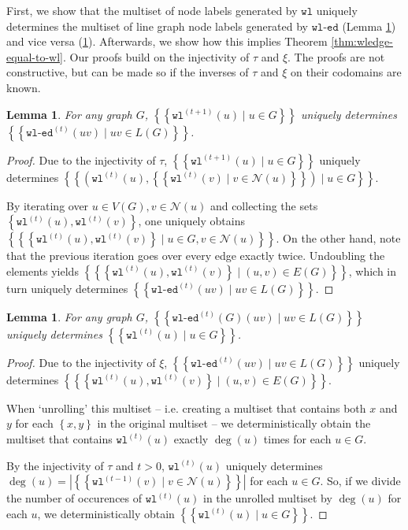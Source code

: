 \documentclass{article}
\newtheorem{lemma}[theorem]{Lemma}
\newcommand{\set}[1]{\left\{#1\right\}}
\newcommand{\multiset}[1]{\left\{\!\!\left\{#1\right\}\!\!\right\}}
\newcommand{\iter}[1]{^{(#1)}}
\newcommand{\wl}{\texttt{wl}}
\newcommand{\wledge}{\texttt{wl-ed}}
\newcommand{\dec}{\xi}
\newcommand{\hash}{\tau}
\newcommand{\nbh}{\mathcal{N}}
\begin{document}

First, we show that the multiset of node labels generated by $\wl$ uniquely determines the multiset of line graph node labels generated by $\wledge$ (Lemma \ref{lemma:wl-determines-wledge}) and vice versa (\ref{lemma:wledge-determines-wl}). Afterwards, we show how this implies Theorem \ref{thm:wledge-equal-to-wl}. Our proofs build on the injectivity of $\hash$ and $\dec$. The proofs are not constructive, but can be made so if the inverses of $\hash$ and $\dec$ on their codomains are known.

\begin{lemma}   \label{lemma:wl-determines-wledge}
    For any graph $G$, $\multiset{\wl\iter{t+1}(u) \mid u\in G}$ uniquely determines $\multiset{\wledge\iter{t}(uv) \mid uv\in L(G)}$.
\end{lemma}
\begin{proof}
    Due to the injectivity of $\hash$,
    $\multiset{\wl\iter{t+1}(u) \mid u\in G}$
    uniquely determines
    $\multiset{\left(
        \wl\iter{t}(u),
        \multiset{\wl\iter{t}(v) \mid v\in \nbh(u)}
    \right) \mid u\in G}$.

    By iterating over $u\in V(G), v\in\nbh(u)$ and collecting the sets $\set{\wl\iter{t}(u), \wl\iter{t}(v)}$, one uniquely obtains $\multiset{\set{\wl\iter{t}(u), \wl\iter{t}(v)} \mid u\in G, v\in\nbh(u)}$.
    On the other hand, note that the previous iteration goes over every edge exactly twice. Undoubling the elements yields $\multiset{\set{\wl\iter{t}(u), \wl\iter{t}(v)} \mid (u,v)\in E(G)}$, which in turn uniquely determines $\multiset{\wledge\iter{t}(uv) \mid uv\in L(G)}$.

\end{proof}

\begin{lemma}   \label{lemma:wledge-determines-wl}
    For any graph $G$, $\multiset{\wledge\iter{t}(G)(uv) \mid uv\in L(G)}$ uniquely determines $\multiset{\wl\iter{t}(u) \mid u\in G}$.
\end{lemma}
\begin{proof}
    Due to the injectivity of $\dec$,
    $\multiset{\wledge\iter{t}(uv) \mid uv\in L(G)}$
    uniquely determines
    $\multiset{\set{\wl\iter{t}(u), \wl\iter{t}(v)} \mid (u,v)\in E(G)}$.

    When `unrolling' this multiset -- i.e. creating a multiset that contains both $x$ and $y$ for each $\set{x,y}$ in the original multiset -- we deterministically obtain the multiset that contains $\wl\iter{t}(u)$ exactly $\deg(u)$ times for each $u\in G$.

    By the injectivity of $\hash$ and $t>0$, $\wl\iter{t}(u)$ uniquely determines $\deg(u) = \left\lvert\multiset{\wl\iter{t-1}(v) \mid v\in \nbh(u)}\right\rvert$ for each $u\in G$. So, if we divide the number of occurences of $\wl\iter{t}(u)$ in the unrolled multiset by $\deg(u)$ for each $u$, we deterministically obtain $\multiset{\wl\iter{t}(u) \mid u\in G}$.
\end{proof}
\end{document}
